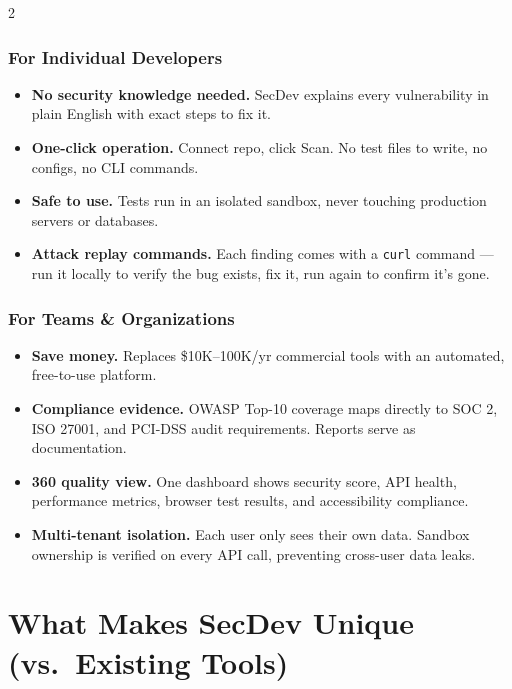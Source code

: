 \documentclass[11pt, a4paper]{article}
\begin{document}
\begin{multicols}{2}

\subsubsection{\faDev\enspace For Individual Developers}
\begin{itemize}[leftmargin=1em, itemsep=3pt, topsep=2pt]
  \item \textbf{No security knowledge needed.} SecDev explains every vulnerability in plain English with exact steps to fix it.
  \item \textbf{One-click operation.} Connect repo, click Scan. No test files to write, no configs, no CLI commands.
  \item \textbf{Safe to use.} Tests run in an isolated sandbox, never touching production servers or databases.
  \item \textbf{Attack replay commands.} Each finding comes with a \texttt{curl} command --- run it locally to verify the bug exists, fix it, run again to confirm it's gone.
\end{itemize}

\subsubsection{\faBuilding\enspace For Teams \& Organizations}
\begin{itemize}[leftmargin=1em, itemsep=3pt, topsep=2pt]
  \item \textbf{Save money.} Replaces \$10K--100K/yr commercial tools with an automated, free-to-use platform.
  \item \textbf{Compliance evidence.} OWASP Top-10 coverage maps directly to SOC 2, ISO 27001, and PCI-DSS audit requirements. Reports serve as documentation.
  \item \textbf{360\textdegree{} quality view.} One dashboard shows security score, API health, performance metrics, browser test results, and accessibility compliance.
  \item \textbf{Multi-tenant isolation.} Each user only sees their own data. Sandbox ownership is verified on every API call, preventing cross-user data leaks.
\end{itemize}
\end{multicols}

\section{What Makes SecDev Unique (vs.\ Existing Tools)}
\end{document}
